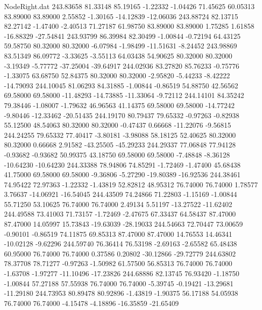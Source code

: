 \begin{filecontents}{NodeRight.dat}
 243.83658   81.33148   85.19165    -1.22332   -1.04426   71.45625   60.05313   83.89000   83.89000    2.55852   -1.30165  -14.12839  -12.06036
 243.88724   82.13715   82.27142    -1.47400   -2.40513   71.27187   61.98750   83.89000   83.89000    1.75285    1.61858  -16.88329  -27.54841
 243.93799   86.39984   82.30499    -1.00844   -0.72194   64.43125   59.58750   80.32000   80.32000   -6.07984   -1.98499  -11.51631   -8.24452
 243.98869   83.51349   86.09772    -3.33625   -3.55113   64.03438   54.90625   80.32000   80.32000   -3.19349   -5.77772  -37.25004  -39.64917
 244.02936   83.27820   85.76233    -0.75776   -1.33075   63.68750   52.84375   80.32000   80.32000   -2.95820   -5.44233   -8.42222  -14.79093
 244.10045   81.06293   84.31885    -1.00844   -0.86519   54.88750   42.56562   69.58000   69.58000  -11.48293  -14.73885  -11.33064   -9.72112
 244.14101   84.35242   79.38446    -1.08007   -1.79632   46.96563   41.14375   69.58000   69.58000  -14.77242   -9.80446  -12.33462  -20.51435
 244.19170   80.79437   79.65332    -0.97263   -0.82938   55.12500   48.54063   80.32000   80.32000   -0.47437    0.66668  -11.22076   -9.56815
 244.24255   79.65332   77.40417    -3.80181   -3.98088   58.18125   52.40625   80.32000   80.32000    0.66668    2.91582  -43.25505  -45.29233
 244.29337   77.06848   77.94128    -0.93682   -0.93682   50.99375   43.18750   69.58000   69.58000   -7.48848   -8.36128  -10.64230  -10.64230
 244.33388   78.94806   74.85291    -1.72469   -1.47400   45.68438   41.75000   69.58000   69.58000   -9.36806   -5.27290  -19.80389  -16.92536
 244.38461   74.95422   72.97363    -1.22332   -1.43819   52.82812   48.95312   76.74000   76.74000    1.78577    3.76637  -14.06921  -16.54045
 244.43509   74.24866   71.22803    -1.15169   -1.00844   55.71250   53.10625   76.74000   76.74000    2.49134    5.51197  -13.27522  -11.62402
 244.49588   73.41003   71.73157    -1.72469   -2.47675   67.33437   64.58437   87.47000   87.47000   14.05997   15.73843  -19.63039  -28.19033
 244.54663   72.70447   73.00659    -0.90101   -0.86519   74.11875   69.85313   87.47000   87.47000   14.76553   14.46341  -10.02128   -9.62296
 244.59740   76.36414   76.53198    -2.69163   -2.65582   65.48438   60.95000   76.74000   76.74000    0.37586    0.20802  -30.12866  -29.72779
 244.63802   78.37708   78.71277    -0.97263   -1.50982   61.57500   56.85313   76.74000   76.74000   -1.63708   -1.97277  -11.10496  -17.23826
 244.68886   82.13745   76.93420    -1.18750   -1.00844   57.27188   57.55938   76.74000   76.74000   -5.39745   -0.19421  -13.29681  -11.29180
 244.73953   80.89478   80.92896    -1.43819   -1.90375   56.17188   54.05938   76.74000   76.74000   -4.15478   -4.18896  -16.35859  -21.65409

\end{filecontents}
